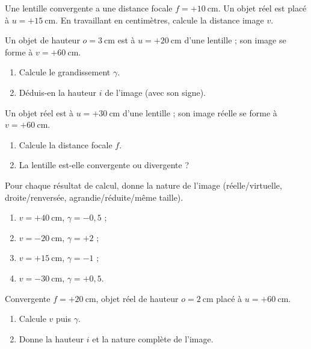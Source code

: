 \documentclass[11pt,a4paper]{article}
\begin{document}

\begin{exo}
Une lentille convergente a une distance focale $f=+\qty{10}{\cm}$. Un objet réel est placé à
$u=+\qty{15}{\cm}$. En travaillant en centimètres, calcule la distance image $v$.
\end{exo}

\begin{exo}
Un objet de hauteur $o=\qty{3}{\cm}$ est à $u=+\qty{20}{\cm}$ d'une lentille ; son image se forme à
$v=+\qty{60}{\cm}$.
\begin{enumerate}[label=\alph*)]
  \item Calcule le grandissement $\gamma$.
  \item Déduis-en la hauteur $i$ de l'image (avec son signe).
\end{enumerate}
\end{exo}

\begin{exo}
Un objet réel est à $u=+\qty{30}{\cm}$ d'une lentille ; son image réelle se forme à $v=+\qty{60}{\cm}$.
\begin{enumerate}[label=\alph*)]
  \item Calcule la distance focale $f$.
  \item La lentille est-elle convergente ou divergente ?
\end{enumerate}
\end{exo}

\begin{exo}
Pour chaque résultat de calcul, donne la nature de l'image (réelle/virtuelle, droite/renversée,
agrandie/réduite/même taille).
\begin{enumerate}[label=\alph*)]
  \item $v=+\qty{40}{\cm}$, $\gamma=-0{,}5$ ;
  \item $v=-\qty{20}{\cm}$, $\gamma=+2$ ;
  \item $v=+\qty{15}{\cm}$, $\gamma=-1$ ;
  \item $v=-\qty{30}{\cm}$, $\gamma=+0{,}5$.
\end{enumerate}
\end{exo}

\begin{exo}
Convergente $f=+\qty{20}{\cm}$, objet réel de hauteur $o=\qty{2}{\cm}$ placé à $u=+\qty{60}{\cm}$.
\begin{enumerate}[label=\alph*)]
  \item Calcule $v$ puis $\gamma$.
  \item Donne la hauteur $i$ et la nature complète de l'image.
\end{enumerate}
\end{exo}
\end{document}
